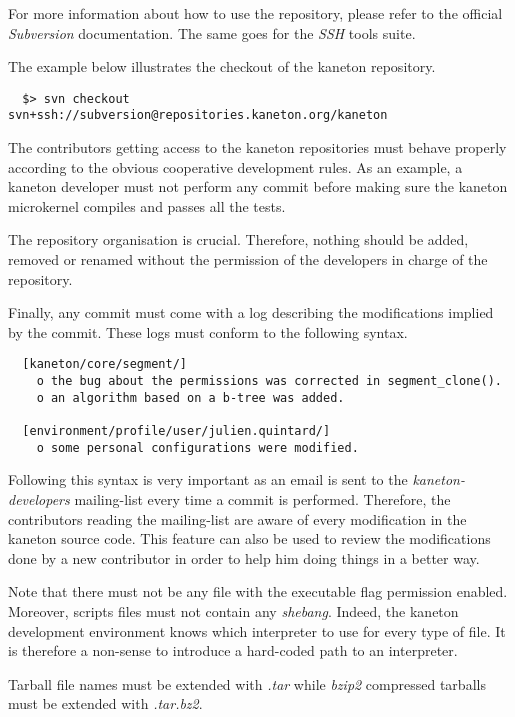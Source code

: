 For more information about how to use the repository, please refer to the
official \textit{Subversion} documentation. The same goes for the
\textit{SSH} tools suite.

The example below illustrates the checkout of the kaneton repository.

\begin{verbatim}
  $> svn checkout svn+ssh://subversion@repositories.kaneton.org/kaneton
\end{verbatim}

The contributors getting access to the kaneton repositories must behave
properly according to the obvious cooperative development rules. As an
example, a kaneton developer must not perform any commit before making sure
the kaneton microkernel compiles and passes all the tests.

The repository organisation is crucial. Therefore, nothing should be
added, removed or renamed without the permission of the developers in charge
of the repository.

Finally, any commit must come with a log describing the modifications
implied by the commit. These logs must conform to the following syntax.

\begin{verbatim}
  [kaneton/core/segment/]
    o the bug about the permissions was corrected in segment_clone().
    o an algorithm based on a b-tree was added.

  [environment/profile/user/julien.quintard/]
    o some personal configurations were modified.
\end{verbatim}

Following this syntax is very important as an email is sent to the
\textit{kaneton-developers} mailing-list every time a commit is performed.
Therefore, the contributors reading the mailing-list are aware of every
modification in the kaneton source code. This feature can also be used
to review the modifications done by a new contributor in order to help
him doing things in a better way.

Note that there must not be any file with the executable flag permission
enabled. Moreover, scripts files must not contain any \textit{shebang}.
Indeed, the kaneton development environment knows which interpreter to
use for every type of file. It is therefore a non-sense to introduce a
hard-coded path to an interpreter.

Tarball file names must be extended with \textit{.tar} while \textit{bzip2}
compressed tarballs must be extended with \textit{.tar.bz2}.
